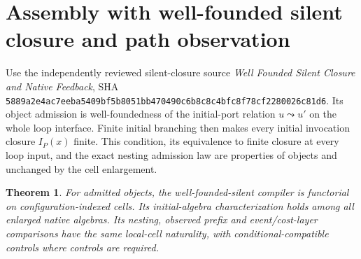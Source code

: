\documentclass[11pt]{article}
\newtheorem{theorem}[definition]{Theorem}
\begin{document}
\section{Assembly with well-founded silent closure and path observation}
Use the independently reviewed silent-closure source
\emph{Well Founded Silent Closure and Native Feedback}, SHA
\texttt{5889a2e4ac7eeba5409bf5b8051bb470490c6b8c8c4bfc8f78cf2280026c81d6}.
Its object admission is well-foundedness of the initial-port relation
$u\leadsto u'$ on the whole loop interface. Finite initial branching then
makes every initial invocation closure $I_P(x)$ finite. This condition,
its equivalence to finite closure at every loop input, and the exact nesting
admission law are properties of objects and unchanged by the cell enlargement.

\begin{theorem}
For admitted objects, the well-founded-silent compiler is functorial on
configuration-indexed cells. Its initial-algebra characterization holds
among all enlarged native algebras. Its nesting, observed prefix and
event/cost-layer comparisons have the same local-cell naturality, with
conditional-compatible controls where controls are required.
\end{theorem}
\end{document}

